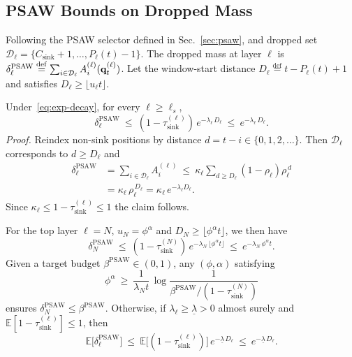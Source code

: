 \subsection{PSAW Bounds on Dropped Mass}
\label{sec:psaw-bound}

Following the PSAW selector defined in Sec.~\ref{sec:psaw}, and dropped set $\mathcal{D}_\ell=\{C_{\text{sink}}+1,\dots,P_\ell(t)-1\}$.
The dropped mass at layer $\ell$ is $\delta^{\mathrm{PSAW}}_\ell
\stackrel{\mathrm{def}}{=}\sum_{i\in\mathcal{D}_\ell} A^{(\ell)}_i(\mathbf{q}^{(\ell)}_t)$. Let the window-start distance $D_\ell\stackrel{\mathrm{def}}{=} t-P_\ell(t)+1$ and satisfies $D_\ell\ge \lfloor u_\ell t\rfloor$.

\begin{theorem}
\label{thm:PSAW}
Under~\eqref{eq:exp-decay}, for every $\ell\ge\ell_s$,
\[
\delta^{\mathrm{PSAW}}_\ell
\ \le\
(1-\tau^{(\ell)}_{\mathrm{sink}})\,e^{-\lambda_\ell\,D_\ell}
\ \le\
e^{-\lambda_\ell\,D_\ell}.
\]
\emph{Proof.}
Reindex non-sink positions by distance $d=t-i\in\{0,1,2,\dots\}$. Then $\mathcal{D}_\ell$ corresponds to $d\ge D_\ell$ and
\begin{equation}
\begin{aligned}
\delta^{\mathrm{PSAW}}_\ell
&=\sum_{i\in\mathcal{D}_\ell}A^{(\ell)}_i
\ \le\
\kappa_\ell\sum_{d\ge D_\ell}(1-\rho_\ell)\rho_\ell^{\,d} \\
&=\kappa_\ell\,\rho_\ell^{\,D_\ell}
=\kappa_\ell\,e^{-\lambda_\ell D_\ell}.
\end{aligned}
\end{equation}
Since $\kappa_\ell\le 1-\tau^{(\ell)}_{\mathrm{sink}}\le 1$ the claim follows.
\qedhere
\end{theorem}

For the top layer $\ell=N$, $u_N=\phi^\alpha$ and $D_N\ge \lfloor \phi^\alpha t\rfloor$, we then have
\[
\delta^{\mathrm{PSAW}}_N
\ \le\
(1-\tau^{(N)}_{\mathrm{sink}})\,e^{-\lambda_N\,\lfloor \phi^\alpha t\rfloor}
\ \le\
e^{-\lambda_N\,\phi^\alpha t}.
\]
Given a target budget $\beta^{\mathrm{PSAW}}\in(0,1)$, any $(\phi,\alpha)$ satisfying
\[
\phi^\alpha
\ \ge\
\frac{1}{\lambda_N t}\,\log\!\frac{1}{\beta^{\mathrm{PSAW}}/(1-\tau^{(N)}_{\mathrm{sink}})}
\]
ensures $\delta^{\mathrm{PSAW}}_N\le \beta^{\mathrm{PSAW}}$. Otherwise, if $\lambda_\ell \ge \underline{\lambda}>0$ almost surely and
$\mathbb{E}[1-\tau^{(\ell)}_{\mathrm{sink}}]\le 1$, then
\[
\mathbb{E}\big[\delta^{\mathrm{PSAW}}_\ell\big]
\ \le\
\mathbb{E}\big[(1-\tau^{(\ell)}_{\mathrm{sink}})\big]\,e^{-\underline{\lambda}\,D_\ell}
\ \le\
e^{-\underline{\lambda}\,D_\ell}.
\]

